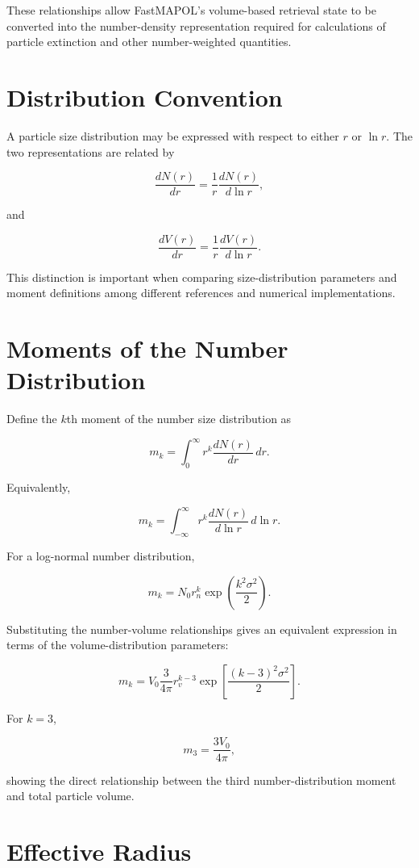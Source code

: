 \documentclass[
  11pt,
  letterpaper,
]{scrreprt}
\begin{document}
These relationships allow FastMAPOL's volume-based retrieval state to be
converted into the number-density representation required for
calculations of particle extinction and other number-weighted
quantities.

\section{Distribution Convention}\label{distribution-convention}

A particle size distribution may be expressed with respect to either
\(r\) or \(\ln r\). The two representations are related by

\[
\frac{dN(r)}{dr}
=
\frac{1}{r}
\frac{dN(r)}{d\ln r},
\]

and

\[
\frac{dV(r)}{dr}
=
\frac{1}{r}
\frac{dV(r)}{d\ln r}.
\]

This distinction is important when comparing size-distribution
parameters and moment definitions among different references and
numerical implementations.

\section{Moments of the Number
Distribution}\label{moments-of-the-number-distribution}

Define the \(k\)th moment of the number size distribution as

\[
m_k
=
\int_0^\infty
r^k
\frac{dN(r)}{dr}\,dr.
\]

Equivalently,

\[
m_k
=
\int_{-\infty}^{\infty}
r^k
\frac{dN(r)}{d\ln r}\,d\ln r.
\]

For a log-normal number distribution,

\[
m_k
=
N_0r_n^k
\exp
\left(
\frac{k^2\sigma^2}{2}
\right).
\]

Substituting the number-volume relationships gives an equivalent
expression in terms of the volume-distribution parameters:

\[
m_k
=
V_0
\frac{3}{4\pi}
r_v^{k-3}
\exp
\left[
\frac{(k-3)^2\sigma^2}{2}
\right].
\]

For \(k=3\),

\[
m_3
=
\frac{3V_0}{4\pi},
\]

showing the direct relationship between the third number-distribution
moment and total particle volume.

\section{Effective Radius}\label{effective-radius}
\end{document}
